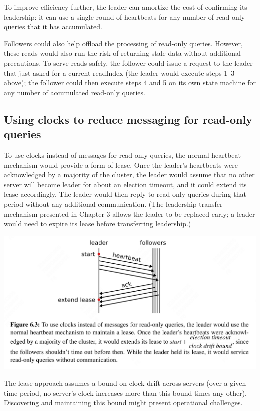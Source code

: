 \documentclass[11pt]{article}
\begin{document}
To improve efficiency further, the leader can amortize the cost of confirming its leadership: it can
use a single round of heartbeats for any number of read-only queries that it has accumulated.

Followers could also help offload the processing of read-only queries. However, these reads would also
run the risk of returning stale data without additional precautions. To serve reads safely, the
follower could issue a request to the leader that just asked for a current readIndex (the leader would
execute steps 1–3 above); the follower could then execute steps 4 and 5 on its own state machine for
any number of accumulated read-only queries.
\subsection{Using clocks to reduce messaging for read-only queries}
\label{sec:orgd70e2a1}
To use clocks instead of messages for read-only queries, the normal heartbeat mechanism would provide
a form of lease. Once the leader’s heartbeats were acknowledged by a majority of the cluster, the
leader would assume that no other server will become leader for about an election timeout, and it
could extend its lease accordingly. The leader would then reply to read-only queries during that
period without any additional communication.
(The leadership transfer mechanism presented in Chapter 3 allows the leader to be replaced early; a
leader would need to expire its lease before transferring leadership.)
\begin{center}
\includegraphics[width=.99\textwidth]{../../images/papers/22.png}
\label{}
\end{center}

The lease approach assumes a bound on clock drift across servers (over a given time period, no
server's clock increases more than this bound times any other). Discovering and maintaining this bound
might present operational challenges.
\end{document}
